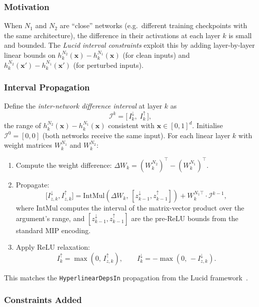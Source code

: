 \documentclass[11pt,a4paper]{article}
\theoremstyle{definition}
\theoremstyle{plain}
\newcommand{\NN}[1]{N_{#1}}
\newcommand{\vx}{\mathbf{x}}
\newcommand{\vxp}{\mathbf{x}'}
\newcommand{\RI}[1]{\mathcal{I}^{#1}}
\begin{document}
\subsubsection{Motivation}

When $\NN{1}$ and $\NN{2}$ are ``close'' networks (e.g.\ different training checkpoints with the same architecture), the difference in their activations at each layer $k$ is small and bounded. The \emph{Lucid interval constraints} exploit this by adding layer-by-layer linear bounds on $h_k^{\NN{2}}(\vx) - h_k^{\NN{1}}(\vx)$ (for clean inputs) and $h_k^{\NN{2}}(\vxp) - h_k^{\NN{1}}(\vxp)$ (for perturbed inputs).

\subsubsection{Interval Propagation}

Define the \emph{inter-network difference interval} at layer $k$ as
\[
  \RI{k} = \bigl[\,I_k^{\downarrow},\; I_k^{\uparrow}\,\bigr],
\]
the range of $h_k^{\NN{2}}(\vx) - h_k^{\NN{1}}(\vx)$ consistent with $\vx \in [0,1]^d$. Initialise $\RI{0} = [0, 0]$ (both networks receive the same input). For each linear layer $k$ with weight matrices $W^{\NN{1}}_k$ and $W^{\NN{2}}_k$:

\begin{enumerate}
  \item Compute the weight difference: $\Delta W_k = (W^{\NN{2}}_k)^\top - (W^{\NN{1}}_k)^\top$.
  \item Propagate:
    \[
      \bigl[I_{z,k}^{\downarrow}, I_{z,k}^{\uparrow}\bigr] = \mathrm{IntMul}(\Delta W_k,\, [z_{k-1}^{\downarrow}, z_{k-1}^{\uparrow}]) + W^{\NN{1}\top}_k \cdot \RI{k-1},
    \]
    where $\mathrm{IntMul}$ computes the interval of the matrix-vector product over the argument's range, and $[z_{k-1}^{\downarrow}, z_{k-1}^{\uparrow}]$ are the pre-ReLU bounds from the standard MIP encoding.
  \item Apply ReLU relaxation:
    \[
      I_k^{\uparrow} = \max(0,\, I_{z,k}^{\uparrow}), \qquad I_k^{\downarrow} = -\max(0,\, -I_{z,k}^{\downarrow}).
    \]
\end{enumerate}

This matches the \texttt{HyperlinearDepsIn} propagation from the Lucid framework~\cite{lucid}.

\subsubsection{Constraints Added}
\end{document}
